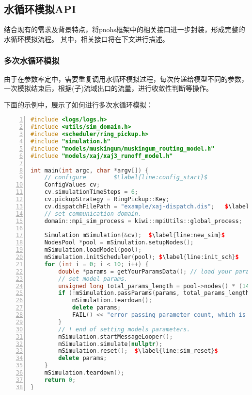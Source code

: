 \subsection{水循环模拟API}
结合现有的需求及背景特点，将pnohs框架中的相关接口进一步封装，形成完整的水循环模拟流程。
其中，相关接口将在下文进行描述。

\subsubsection{多次水循环模拟}
由于在参数率定中，需要重复调用水循环模拟过程，每次传递给模型不同的参数，一次模拟结束后，根据(子)流域出口的流量，进行收敛性判断等操作。

下面的示例中，展示了如何进行多次水循环模拟：

\begin{lstlisting}[caption={多次水循环模拟例程},label={code:multi_sim_example},language=c++,numbers=left,escapechar=$]
#include <logs/logs.h>
#include <utils/sim_domain.h>
#include <scheduler/ring_pickup.h>
#include "simulation.h"
#include "models/muskingum/muskingum_routing_model.h"
#include "models/xaj/xaj3_runoff_model.h"

int main(int argc, char *argv[]) {
    // configure        $\label{line:config_start}$
    ConfigValues cv;
    cv.simulationTimeSteps = 6;
    cv.pickupStrategy = RingPickup::Key;
    cv.dispatchFilePath = "example/xaj-dispatch.dis";   $\label{line:config_end}$
    // set communication domain.
    domain::mpi_sim_process = kiwi::mpiUtils::global_process;

    Simulation mSimulation(&cv);  $\label{line:new_sim}$
    NodesPool *pool = mSimulation.setupNodes();
    mSimulation.loadModel(pool);
    mSimulation.initScheduler(pool); $\label{line:init_sch}$
    for (int i = 0; i < 10; i++) {
        double *params = getYourParamsData(); // load your parameters here.
        // set model params.
        unsigned long total_params_length = pool->nodes() * (14 + 1); // lenght of array params
        if (!mSimulation.passParams(params, total_params_length)) {
            mSimulation.teardown();
            delete params;
            FAIL() << "error passing parameter count, which is " << total_params_length;
        }
        // ! end of setting models parameters.
        mSimulation.startMessageLooper();
        mSimulation.simulate(nullptr);
        mSimulation.reset();  $\label{line:sim_reset}$
        delete params;
    }
    mSimulation.teardown();
    return 0;
}
\end{lstlisting}

